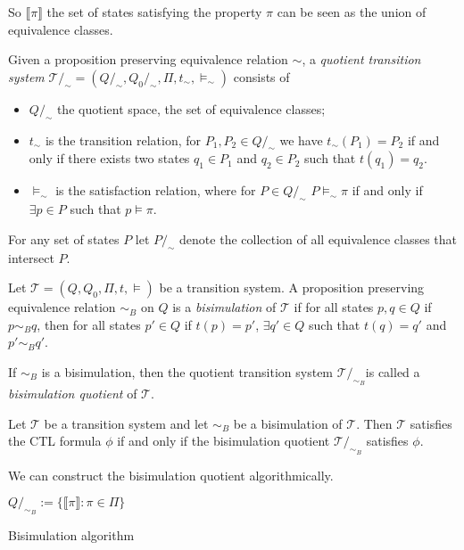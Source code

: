 So $\llbracket \pi\rrbracket$ the set of states satisfying the property $\pi$ can be seen as the union of equivalence classes.

\begin{defi}
Given a proposition preserving equivalence relation $\sim$, a \emph{quotient transition system} $\mathcal{T}/_{\sim}=(Q/_{\sim},Q_{0}/_{\sim},\Pi,t_{\sim},\models_{\sim})$ consists of
\begin{itemize}
\item{$Q/_{\sim}$ the quotient space, the set of equivalence classes;}
\item{$t_{\sim}$ is the transition relation, for $P_{1},P_{2}\in Q/_{\sim}$ we have $t_{\sim}(P_{1})=P_{2}$ if and only if there exists two states $q_{1}\in P_{1}$ and $q_{2}\in P_{2}$ such that $t(q_{1})=q_{2}$.}
\item{$\models_{\sim}$ is the satisfaction relation, where for $P\in Q/_{\sim}$ $P\models_{\sim}\pi$ if and only if $\exists p\in P$ such that $p\models \pi$.}
\end{itemize}
\end{defi}

For any set of states $P$ let $P/_{\sim}$ denote the collection of all equivalence classes that intersect $P$.

\begin{defi}
Let $\mathcal{T}=(Q,Q_{0},\Pi,t,\models)$ be a transition system. A proposition preserving equivalence relation $\sim_{B}$ on $Q$ is a \emph{bisimulation} of $\mathcal{T}$ if for all states $p,q\in Q$ if $p \sim_{B} q$, then for all states $p'\in Q$ if $t(p)=p'$, $\exists q'\in Q$ such that $t(q)=q'$ and $p'\sim_{B} q'$.
\end{defi}

If $\sim_{B}$ is a bisimulation, then the quotient transition system $\mathcal{T}/_{\sim_{B}}$is called a \emph{bisimulation quotient} of $\mathcal{T}$.

\begin{thm}
Let $\mathcal{T}$ be a transition system and let $\sim_{B}$ be a bisimulation of $\mathcal{T}$. Then $\mathcal{T}$ satisfies the CTL formula $\phi$ if and only if the bisimulation quotient $\mathcal{T}/_{\sim_{B}}$ satisfies $\phi$.
\end{thm}

We can construct the bisimulation quotient algorithmically.

\begin{algorithm}[H]
$Q/_{\sim_{B}} := \{ \llbracket \pi \rrbracket : \pi \in \Pi\}$\;
\caption{Bisimulation algorithm \cite{Bouajjani,Alur2000}}
\label{alg:bisim}
\end{algorithm}

